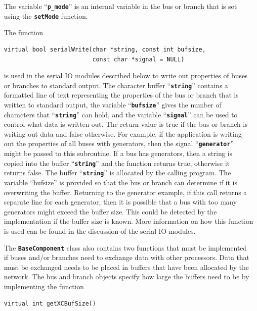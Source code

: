 The variable ``\texttt{\textbf{p\_mode}}'' is an internal variable in the bus or branch that is set using the \texttt{\textbf{setMode}} function.

The function

{
\color{red}
\begin{Verbatim}[fontseries=b]
virtual bool serialWrite(char *string, const int bufsize,
                         const char *signal = NULL)
\end{Verbatim}
}

is used in the serial IO modules described below to write out properties of buses or branches to standard output. The character buffer ``\texttt{\textbf{string}}'' contains a formatted line of text representing the properties of the bus or branch that is written to standard output, the variable ``\texttt{\textbf{bufsize}}'' gives the number of characters that ``\texttt{\textbf{string}}'' can hold, and the variable ``\texttt{\textbf{signal}}'' can be used to control what data is written out. The return value is true if the bus or branch is writing out data and false otherwise. For example, if the application is writing out the properties of all buses with generators, then the signal ``\texttt{\textbf{generator}}'' might be passed to this subroutine. If a bus has generators, then a string is copied into the buffer ``\texttt{\textbf{string}}'' and the function returns true, otherwise it returns false. The buffer ``\texttt{\textbf{string}}'' is allocated by the calling program. The variable ``bufsize'' is provided so that the bus or branch can determine if it is overwriting the buffer. Returning to the generator example, if this call returns a separate line for each generator, then it is possible that a bus with too many generators might exceed the buffer size. This could be detected by the implementation if the buffer size is known. More information on how this function is used can be found in the discussion of the serial IO modules.

The \texttt{\textbf{BaseComponent}} class also contains two functions that must be implemented if buses and/or branches need to exchange data with other processors. Data that must be exchanged needs to be placed in buffers that have been allocated by the network. The bus and branch objects specify how large the buffers need to be by implementing the function

{
\color{red}
\begin{Verbatim}[fontseries=b]
virtual int getXCBufSize()
\end{Verbatim}
}

